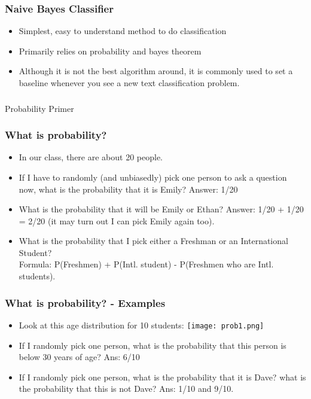 \documentclass{beamer}
\begin{document}
\begin{frame}
\frametitle{Naive Bayes Classifier}
\begin{itemize}
\item Simplest, easy to understand method to do classification
\item Primarily relies on probability and bayes theorem
\item Although it is not the best algorithm around, it is commonly used to set a baseline whenever you see a new text classification problem.
\end{itemize}
\end{frame}

\begin{frame}
\frametitle{}
\begin{center}
\Large Probability Primer
\end{center}
\end{frame}

\begin{frame}
\frametitle{What is probability?}
\begin{itemize}
\item In our class, there are about 20 people. 
\item If I have to randomly (and unbiasedly) pick one person to ask a question now, what is the probability that it is Emily? \pause Answer: 1/20
\item What is the probability that it will be Emily or Ethan? \pause Answer: 1/20 + 1/20 = 2/20 (it may turn out I can pick Emily again too).
\item What is the probability that I pick either a Freshman or an International Student? \pause
\\ Formula: P(Freshmen) + P(Intl. student) - P(Freshmen who are Intl. students).
\end{itemize}
\end{frame}

\begin{frame}
\frametitle{What is probability? - Examples}
\begin{itemize}
\item Look at this age distribution for 10 students: 
\texttt{[image: prob1.png]}
\item If I randomly pick one person, what is the probability that this person is below 30 years of age? \pause Ans: 6/10
\item If I randomly pick one person, what is the probability that it is Dave? what is the probability that this is not Dave? \pause Ans: 1/10 and 9/10.
\end{itemize}
\end{frame}
\end{document}
